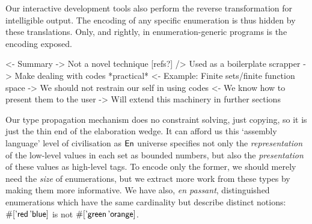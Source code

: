 Our interactive development tools also perform the
reverse transformation for intelligible output.
The encoding of any specific enumeration is thus hidden by these
translations. Only, and rightly, in enumeration-generic programs is the
encoding exposed.

\begin{wstructure}
<- Summary
    -> Not a novel technique [refs?]
        /> Used as a boilerplate scrapper
    -> Make dealing with codes *practical*
        <- Example: Finite sets/finite function space
        -> We should not restrain our self in using codes
            <- We know how to present them to the user
-> Will extend this machinery in further sections
\end{wstructure}



Our type propagation mechanism does no constraint
solving, just copying, so it is just the thin end of the elaboration wedge.
It can afford us this `assembly
language' level of civilisation as \(\EnumU\) universe
specifies not only the \emph{representation} of the
low-level values in each set as bounded numbers, but also the
\emph{presentation} of these values as high-level tags. To encode only
the former, we should merely need the \emph{size} of enumerations, but
we extract more work from these types by making them more informative.
We have also, \emph{en passant}, distinguished enumerations which have
the same cardinality but describe distinct notions:
\(\EnumT{\sqr{\etag{\CN{red}}\,\etag{\CN{blue}}}}\) is not
\(\EnumT{\sqr{\etag{\CN{green}}\,\etag{\CN{orange}}}}\).
